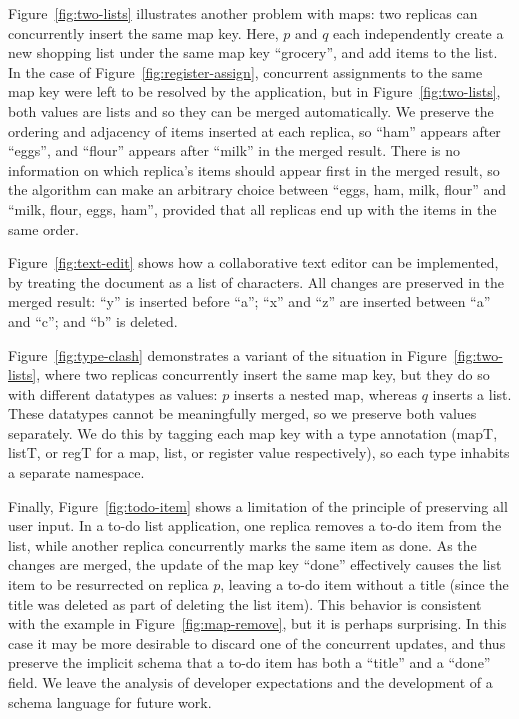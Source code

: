 \documentclass[10pt,journal,compsoc]{IEEEtran}
\begin{document}
Figure~\ref{fig:two-lists} illustrates another problem with maps: two replicas can concurrently insert the same map key. Here, $p$ and $q$ each independently create a new shopping list under the same map key ``grocery'', and add items to the list. In the case of Figure~\ref{fig:register-assign}, concurrent assignments to the same map key were left to be resolved by the application, but in Figure~\ref{fig:two-lists}, both values are lists and so they can be merged automatically. We preserve the ordering and adjacency of items inserted at each replica, so ``ham'' appears after ``eggs'', and ``flour'' appears after ``milk'' in the merged result. There is no information on which replica's items should appear first in the merged result, so the algorithm can make an arbitrary choice between ``eggs, ham, milk, flour'' and ``milk, flour, eggs, ham'', provided that all replicas end up with the items in the same order.

Figure~\ref{fig:text-edit} shows how a collaborative text editor can be implemented, by treating the document as a list of characters. All changes are preserved in the merged result: ``y'' is inserted before ``a''; ``x'' and ``z'' are inserted between ``a'' and ``c''; and ``b'' is deleted.

Figure~\ref{fig:type-clash} demonstrates a variant of the situation in Figure~\ref{fig:two-lists}, where two replicas concurrently insert the same map key, but they do so with different datatypes as values: $p$ inserts a nested map, whereas $q$ inserts a list. These datatypes cannot be meaningfully merged, so we preserve both values separately. We do this by tagging each map key with a type annotation (\textsf{mapT}, \textsf{listT}, or \textsf{regT} for a map, list, or register value respectively), so each type inhabits a separate namespace.

Finally, Figure~\ref{fig:todo-item} shows a limitation of the principle of preserving all user input. In a to-do list application, one replica removes a to-do item from the list, while another replica concurrently marks the same item as done. As the changes are merged, the update of the map key ``done'' effectively causes the list item to be resurrected on replica $p$, leaving a to-do item without a title (since the title was deleted as part of deleting the list item). This behavior is consistent with the example in Figure~\ref{fig:map-remove}, but it is perhaps surprising. In this case it may be more desirable to discard one of the concurrent updates, and thus preserve the implicit schema that a to-do item has both a ``title'' and a ``done'' field. We leave the analysis of developer expectations and the development of a schema language for future work.
\end{document}
